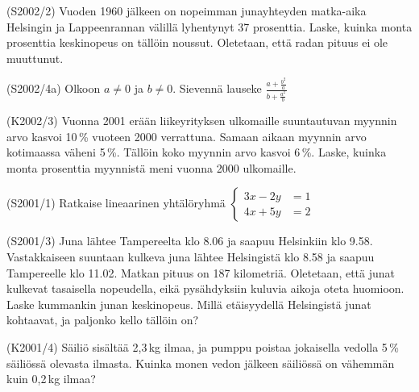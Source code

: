 \begin{tehtava}(S2002/2)   Vuoden 1960 jälkeen on nopeimman junayhteyden matka-aika Helsingin ja Lappeenrannan välillä lyhentynyt 37 prosenttia. Laske, kuinka monta prosenttia keskinopeus on tällöin noussut. Oletetaan, että radan pituus ei ole muuttunut.
\end{tehtava}

\begin{tehtava}(S2002/4a)  Olkoon $ a \neq 0$ ja $b \neq 0 $. Sievennä lauseke
                        $
                            \frac{a + \frac{b^2}{a} } {b + \frac{a^2}{b} }
                        $
\end{tehtava}

\begin{tehtava}(K2002/3)   Vuonna 2001 erään liikeyrityksen ulkomaille suuntautuvan
                        myynnin arvo kasvoi 10\,\% vuoteen 2000 verrattuna. Samaan
                        aikaan myynnin arvo kotimaassa väheni 5\,\%. Tällöin koko
                        myynnin arvo kasvoi 6\,\%. Laske, kuinka monta prosenttia
                        myynnistä meni vuonna 2000 ulkomaille.
\end{tehtava}

\begin{tehtava}(S2001/1)   Ratkaise lineaarinen yhtälöryhmä
                       $
                         \left\{
                          \begin{aligned}
                             3x - 2y &= 1 \\
                             4x + 5y &= 2                      
                         \end{aligned}
                         \right.
                       $
\end{tehtava}

\begin{tehtava}(S2001/3)   Juna lähtee Tampereelta klo 8.06 ja saapuu Helsinkiin klo 9.58.
                        Vastakkaiseen suuntaan kulkeva juna lähtee Helsingistä klo 8.58
                        ja saapuu Tampereelle klo 11.02. Matkan pituus on 187 kilometriä.
                        Oletetaan, että junat kulkevat tasaisella nopeudella, eikä
                        pysähdyksiin kuluvia aikoja oteta huomioon. Laske kummankin
                        junan keskinopeus. Millä etäisyydellä Helsingistä junat
                        kohtaavat, ja paljonko kello tällöin on? 
\end{tehtava}

\begin{tehtava}(K2001/4)   Säiliö sisältää 2,3\,kg ilmaa, ja pumppu poistaa jokaisella
                        vedolla 5\,\% säiliössä olevasta ilmasta. Kuinka monen vedon
                        jälkeen säiliössä on vähemmän kuin 0,2\,kg ilmaa?
\end{tehtava}

